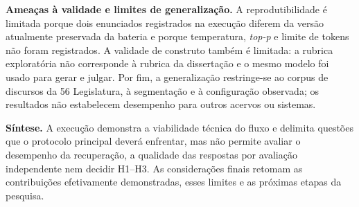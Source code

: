 \noindent\textbf{Ameaças à validade e limites de generalização.} A reprodutibilidade é limitada porque dois enunciados registrados na execução diferem da versão atualmente preservada da bateria e porque temperatura, \textit{top-p} e limite de tokens não foram registrados. A validade de construto também é limitada: a rubrica exploratória não corresponde à rubrica da dissertação e o mesmo modelo foi usado para gerar e julgar. Por fim, a generalização restringe-se ao corpus de discursos da 56\textordfeminine{} Legislatura, à segmentação e à configuração observada; os resultados não estabelecem desempenho para outros acervos ou sistemas.

\noindent\textbf{Síntese.} A execução demonstra a viabilidade técnica do fluxo e delimita questões que o protocolo principal deverá enfrentar, mas não permite avaliar o desempenho da recuperação, a qualidade das respostas por avaliação independente nem decidir H1--H3. As considerações finais retomam as contribuições efetivamente demonstradas, esses limites e as próximas etapas da pesquisa.
